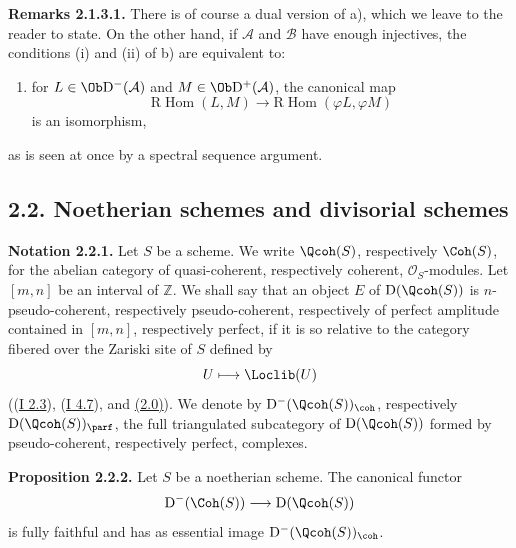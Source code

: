 \textbf{Remarks 2.1.3.1.} There is of course a dual version of a), which we leave to the reader to state. On the other hand, if $\mathcal A$ and $\mathcal B$ have enough injectives, the conditions (i) and (ii) of b) are equivalent to:
\begin{enumerate}[label=(\roman*),start=3]
\item for $L\in\Ob\mathrm D^{-}(\mathcal A)$ and $M\in\Ob\mathrm D^{+}(\mathcal A)$, the canonical map
\[
\mathrm R\!\operatorname{Hom}(L,M)\longrightarrow
\mathrm R\!\operatorname{Hom}(\varphi L,\varphi M)
\]
is an isomorphism,
\end{enumerate}
as is seen at once by a spectral sequence argument.

\subsection*{2.2. Noetherian schemes and divisorial schemes}

\textbf{Notation 2.2.1.} Let $S$ be a scheme. We write $\Qcoh(S)$, respectively $\Coh(S)$, for the abelian category of quasi-coherent, respectively coherent, $\mathcal O_S$-modules. Let $[m,n]$ be an interval of $\mathbb Z$. We shall say that an object $E$ of $\mathrm D(\Qcoh(S))$ is $n$-pseudo-coherent, respectively pseudo-coherent, respectively of perfect amplitude contained in $[m,n]$, respectively perfect, if it is so relative to the category fibered over the Zariski site of $S$ defined by
\[
U\longmapsto \Loclib(U)
\]
((\hyperlink{sga6.e01.def.2-3}{I 2.3}), (\hyperlink{sga6.e01.def.4-7}{I 4.7}), and \hyperlink{sga6.e02.sec.2.0}{(2.0)}). We denote by $\mathrm D^{-}(\Qcoh(S))_{\coh}$, respectively $\mathrm D(\Qcoh(S))_{\parf}$, the full triangulated subcategory of $\mathrm D(\Qcoh(S))$ formed by pseudo-coherent, respectively perfect, complexes.

\textbf{Proposition 2.2.2.} Let $S$ be a noetherian scheme. The canonical functor
\[
\mathrm D^{-}(\Coh(S))\longrightarrow \mathrm D(\Qcoh(S))
\]
is fully faithful and has as essential image $\mathrm D^{-}(\Qcoh(S))_{\coh}$.

